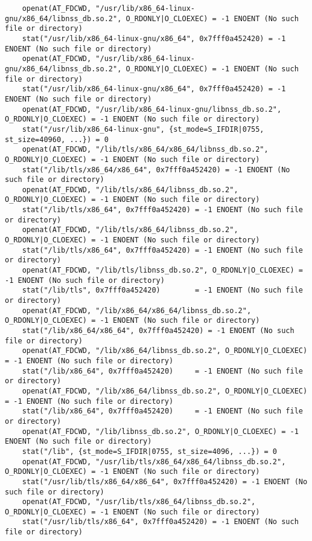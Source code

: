 \documentclass[pdf, unicode, 12pt, a4paper,oneside,fleqn]{article}
\begin{document}
{\begin{verbatim}
    openat(AT_FDCWD, "/usr/lib/x86_64-linux-gnu/x86_64/libnss_db.so.2", O_RDONLY|O_CLOEXEC) = -1 ENOENT (No such file or directory)
    stat("/usr/lib/x86_64-linux-gnu/x86_64", 0x7fff0a452420) = -1 ENOENT (No such file or directory)
    openat(AT_FDCWD, "/usr/lib/x86_64-linux-gnu/x86_64/libnss_db.so.2", O_RDONLY|O_CLOEXEC) = -1 ENOENT (No such file or directory)
    stat("/usr/lib/x86_64-linux-gnu/x86_64", 0x7fff0a452420) = -1 ENOENT (No such file or directory)
    openat(AT_FDCWD, "/usr/lib/x86_64-linux-gnu/libnss_db.so.2", O_RDONLY|O_CLOEXEC) = -1 ENOENT (No such file or directory)
    stat("/usr/lib/x86_64-linux-gnu", {st_mode=S_IFDIR|0755, st_size=40960, ...}) = 0
    openat(AT_FDCWD, "/lib/tls/x86_64/x86_64/libnss_db.so.2", O_RDONLY|O_CLOEXEC) = -1 ENOENT (No such file or directory)
    stat("/lib/tls/x86_64/x86_64", 0x7fff0a452420) = -1 ENOENT (No such file or directory)
    openat(AT_FDCWD, "/lib/tls/x86_64/libnss_db.so.2", O_RDONLY|O_CLOEXEC) = -1 ENOENT (No such file or directory)
    stat("/lib/tls/x86_64", 0x7fff0a452420) = -1 ENOENT (No such file or directory)
    openat(AT_FDCWD, "/lib/tls/x86_64/libnss_db.so.2", O_RDONLY|O_CLOEXEC) = -1 ENOENT (No such file or directory)
    stat("/lib/tls/x86_64", 0x7fff0a452420) = -1 ENOENT (No such file or directory)
    openat(AT_FDCWD, "/lib/tls/libnss_db.so.2", O_RDONLY|O_CLOEXEC) = -1 ENOENT (No such file or directory)
    stat("/lib/tls", 0x7fff0a452420)        = -1 ENOENT (No such file or directory)
    openat(AT_FDCWD, "/lib/x86_64/x86_64/libnss_db.so.2", O_RDONLY|O_CLOEXEC) = -1 ENOENT (No such file or directory)
    stat("/lib/x86_64/x86_64", 0x7fff0a452420) = -1 ENOENT (No such file or directory)
    openat(AT_FDCWD, "/lib/x86_64/libnss_db.so.2", O_RDONLY|O_CLOEXEC) = -1 ENOENT (No such file or directory)
    stat("/lib/x86_64", 0x7fff0a452420)     = -1 ENOENT (No such file or directory)
    openat(AT_FDCWD, "/lib/x86_64/libnss_db.so.2", O_RDONLY|O_CLOEXEC) = -1 ENOENT (No such file or directory)
    stat("/lib/x86_64", 0x7fff0a452420)     = -1 ENOENT (No such file or directory)
    openat(AT_FDCWD, "/lib/libnss_db.so.2", O_RDONLY|O_CLOEXEC) = -1 ENOENT (No such file or directory)
    stat("/lib", {st_mode=S_IFDIR|0755, st_size=4096, ...}) = 0
    openat(AT_FDCWD, "/usr/lib/tls/x86_64/x86_64/libnss_db.so.2", O_RDONLY|O_CLOEXEC) = -1 ENOENT (No such file or directory)
    stat("/usr/lib/tls/x86_64/x86_64", 0x7fff0a452420) = -1 ENOENT (No such file or directory)
    openat(AT_FDCWD, "/usr/lib/tls/x86_64/libnss_db.so.2", O_RDONLY|O_CLOEXEC) = -1 ENOENT (No such file or directory)
    stat("/usr/lib/tls/x86_64", 0x7fff0a452420) = -1 ENOENT (No such file or directory)

\end{verbatim}}
\end{document}
